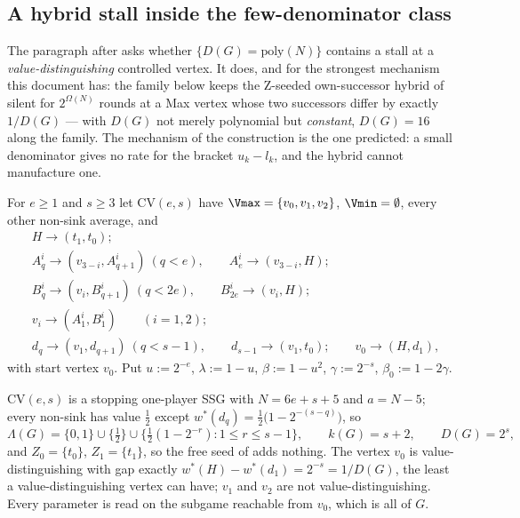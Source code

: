 \subsection{A hybrid stall inside the few-denominator class}\label{sec:fdcv}

The paragraph after  asks whether
$\{D(G)=\mathrm{poly}(N)\}$ contains a stall at a \emph{value-distinguishing}
controlled vertex. It does, and for the strongest mechanism this document
has: the family below keeps the Z-seeded own-successor hybrid of
 silent for $2^{\Omega(N)}$ rounds at a Max vertex whose two
successors differ by exactly $1/D(G)$ --- with $D(G)$ not merely polynomial but
\emph{constant}, $D(G)=16$ along the family. The mechanism of the construction
is the one  predicted: a small denominator gives no
rate for the bracket $u_k-l_k$, and the hybrid cannot manufacture one.

\begin{definition}\label{def:fd-cv}
For $e\ge1$ and $s\ge3$ let $\mathrm{CV}(e,s)$ have
$\Vmax=\{v_0,v_1,v_2\}$, $\Vmin=\emptyset$, every other non-sink average, and
\[
 \begin{aligned}
  &H\to(t_1,t_0);\\
  &A^{i}_q\to(v_{3-i},A^{i}_{q+1})\ (q<e),\qquad A^{i}_{e}\to(v_{3-i},H);\\
  &B^{i}_q\to(v_{i},B^{i}_{q+1})\ (q<2e),\qquad B^{i}_{2e}\to(v_{i},H);\\
  &v_i\to(A^{i}_1,B^{i}_1)\qquad(i=1,2);\\
  &d_q\to(v_1,d_{q+1})\ (q<s-1),\qquad d_{s-1}\to(v_1,t_0);\qquad
   v_0\to(H,d_1),
 \end{aligned}
\]
with start vertex $v_0$. Put $u:=2^{-e}$, $\lambda:=1-u$, $\beta:=1-u^{2}$,
$\gamma:=2^{-s}$, $\beta_0:=1-2\gamma$.
\end{definition}

\begin{proposition}\label{prop:fd-cv-values}
$\mathrm{CV}(e,s)$ is a stopping one-player SSG with $N=6e+s+5$ and
$a=N-5$; every non-sink has value $\tfrac12$ except
$w^\ast(d_q)=\tfrac12\bigl(1-2^{-(s-q)}\bigr)$, so
\[
  \Lambda(G)=\{0,1\}\cup\{\tfrac12\}\cup
  \{\tfrac12(1-2^{-r}):1\le r\le s-1\},\qquad k(G)=s+2,\qquad D(G)=2^{s},
\]
and $Z_0=\{t_0\}$, $Z_1=\{t_1\}$, so the free seed of  adds
nothing. The vertex $v_0$ is value-distinguishing with gap exactly
$w^\ast(H)-w^\ast(d_1)=2^{-s}=1/D(G)$, the least a value-distinguishing vertex
can have; $v_1$ and $v_2$ are not value-distinguishing. Every parameter is read
on the subgame reachable from $v_0$, which is all of $G$.
\end{proposition}

